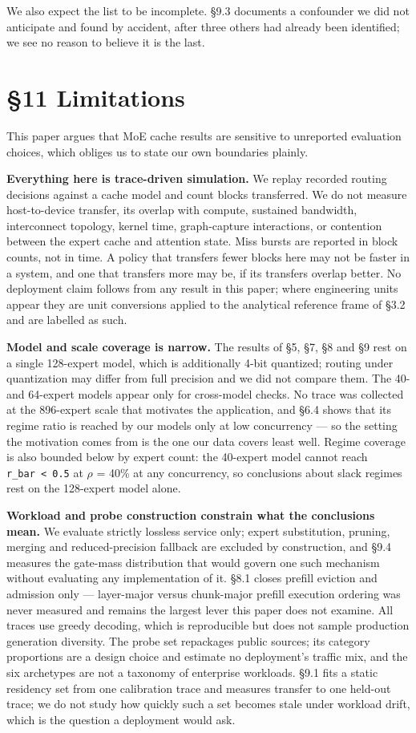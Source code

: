 \documentclass[
  10pt,
  letterpaper,
  10pt]{article}
\begin{document}
We also expect the list to be incomplete. §9.3 documents a confounder we
did not anticipate and found by accident, after three others had already
been identified; we see no reason to believe it is the last.

\section{§11 Limitations}\label{limitations}

This paper argues that MoE cache results are sensitive to unreported
evaluation choices, which obliges us to state our own boundaries
plainly.

\textbf{Everything here is trace-driven simulation.} We replay recorded
routing decisions against a cache model and count blocks transferred. We
do not measure host-to-device transfer, its overlap with compute,
sustained bandwidth, interconnect topology, kernel time, graph-capture
interactions, or contention between the expert cache and attention
state. Miss bursts are reported in block counts, not in time. A policy
that transfers fewer blocks here may not be faster in a system, and one
that transfers more may be, if its transfers overlap better. No
deployment claim follows from any result in this paper; where
engineering units appear they are unit conversions applied to the
analytical reference frame of §3.2 and are labelled as such.

\textbf{Model and scale coverage is narrow.} The results of §5, §7, §8
and §9 rest on a single 128-expert model, which is additionally 4-bit
quantized; routing under quantization may differ from full precision and
we did not compare them. The 40- and 64-expert models appear only for
cross-model checks. No trace was collected at the 896-expert scale that
motivates the application, and §6.4 shows that its regime ratio is
reached by our models only at low concurrency --- so the setting the
motivation comes from is the one our data covers least well. Regime
coverage is also bounded below by expert count: the 40-expert model
cannot reach \texttt{r\_bar\ \textless{}\ 0.5} at \(\rho\) = 40\% at any
concurrency, so conclusions about slack regimes rest on the 128-expert
model alone.

\textbf{Workload and probe construction constrain what the conclusions
mean.} We evaluate strictly lossless service only; expert substitution,
pruning, merging and reduced-precision fallback are excluded by
construction, and §9.4 measures the gate-mass distribution that would
govern one such mechanism without evaluating any implementation of it.
§8.1 closes prefill eviction and admission only --- layer-major versus
chunk-major prefill execution ordering was never measured and remains
the largest lever this paper does not examine. All traces use greedy
decoding, which is reproducible but does not sample production
generation diversity. The probe set repackages public sources; its
category proportions are a design choice and estimate no deployment's
traffic mix, and the six archetypes are not a taxonomy of enterprise
workloads. §9.1 fits a static residency set from one calibration trace
and measures transfer to one held-out trace; we do not study how quickly
such a set becomes stale under workload drift, which is the question a
deployment would ask.
\end{document}
